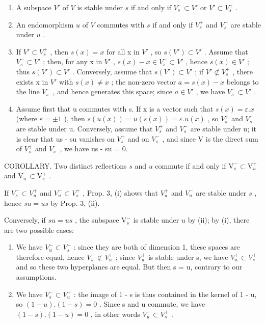 \begin{enumerate}
\def\labelenumi{(\roman{enumi})}
\item
  A subspace \(V'\) of \(V\) is stable under \(s\) if and only if \(V_s^- \subset V'\) or \(V' \subset V_s^+\) .
\item
  An endomorphism \(u\) of \(V\) commutes with \(s\) if and only if \(V_s^+\) and \(V_s^-\) are stable under \(u\) .
\item
  If \(V' \subset V_{s}^{+}\) , then \(s(x) = x\) for all x in \(V'\) , so \(s(V') \subset V'\) . Assume that \(V_{s}^{-} \subset V'\) ; then, for any x in \(V'\) , \(s(x) - x \in V_{s}^{-} \subset V'\) , hence \(s(x) \in V'\) ; thus \(s(V') \subset V'\) . Conversely, assume that \(s(V') \subset V'\) ; if \(V' \not\subset V_{s}^{+}\) , there exists x in \(V'\) with \(s(x) \neq x\) ; the non-zero vector \(a = s(x) - x\) belongs to the line \(V_{s}^{-}\) , and hence generates this space; since \(a \in V'\) , we have \(V_{s}^{-} \subset V'\) .
\item
  Assume first that u commutes with s. If x is a vector such that \(s(x) = \varepsilon.x\) (where \(\varepsilon = \pm1\) ), then \(s(u(x)) = u(s(x)) = \varepsilon.u(x)\) , so \(V_{s}^{+}\) and \(V_{s}^{-}\) are stable under u. Conversely, assume that \(V_{s}^{+}\) and \(V_{s}^{-}\) are stable under u; it is clear that us - su vanishes on \(V_{s}^{+}\) and on \(V_{s}^{-}\) , and since V is the direct sum of \(V_{s}^{+}\) and \(V_{s}^{-}\) , we have us - su = 0.
\end{enumerate}

COROLLARY. Two distinct reflections \(s\) and \(u\) commute if and only if \(\mathrm{V}_s^- \subset \mathrm{V}_u^+\) and \(\mathrm{V}_u^- \subset \mathrm{V}_s^+\) .

If \(V_{s}^{-} \subset V_{u}^{+}\) and \(V_{u}^{-} \subset V_{s}^{+}\) , Prop. 3, (i) shows that \(V_{u}^{+}\) and \(V_{u}^{-}\) are stable under \(s\) , hence \(su = us\) by Prop. 3, (ii).

Conversely, if \(su = us\) , the subspace \(\mathrm{V}_{s}^{-}\) is stable under \(u\) by (ii); by (i), there are two possible cases:

\begin{enumerate}
\def\labelenumi{\alph{enumi})}
\item
  We have \(V_{u}^{-} \subset V_{s}^{-}\) : since they are both of dimension 1, these spaces are therefore equal, hence \(V_{s}^{-} \not\subset V_{u}^{+}\) ; since \(V_{u}^{+}\) is stable under s, we have \(V_{u}^{+} \subset V_{s}^{+}\) and so these two hyperplanes are equal. But then s = u, contrary to our assumptions.
\item
  We have \(V_{s}^{-} \subset V_{u}^{+}\) : the image of 1 - s is thus contained in the kernel of 1 - u, so \((1 - u).(1 - s) = 0\) . Since s and u commute, we have \((1 - s).(1 - u) = 0\) , in other words \(V_{u}^{-} \subset V_{s}^{+}\) .
\end{enumerate}

